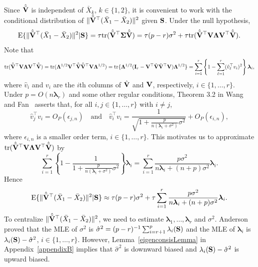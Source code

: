 \documentclass[times,sort&compress,3p]{elsarticle}
\newcommand{\mytr}{ {\rm tr} }
\newcommand{\myE}{ {\rm E} }
\newcommand{\bfsym}[1]{\ensuremath{\boldsymbol{#1}}}
\def\blambda {\bfsym {\lambda}}        \def\bLambda {\bfsym {\Lambda}}
\theoremstyle{plain}
\theoremstyle{definition}
\theoremstyle{remark}
\begin{document}
Since $\hat{\tilde{\mathbf{V}}}$ is independent of $\bar{X}_k$, $k\in\{1,2\}$, it is convenient to work with the conditional distribution of $\|\hat{\tilde{\mathbf{V}}}^\top  (\bar{X}_1-\bar{X}_2)\|^2$ given $\mathbf{S}$. 
Under the null hypothesis, 
\begin{equation*}
    \myE \{ \|\hat{\tilde{\BV}}^\top  (\bar{X}_1-\bar{X}_2)\|^2 |\BS \}
        =
\tau \mytr(\hat{\tilde{\BV}}^\top \bSigma\hat{\tilde{\BV}})
        =
\tau (p-r) \sigma^2+
\tau \mytr(\hat{\tilde{\BV}}^\top \BV \bLambda \BV^\top \hat{\tilde{\BV}}).
\end{equation*}
Note that
\begin{equation*}
    \mytr(\hat{\tilde{\BV}}^\top \BV \bLambda \BV^\top \hat{\tilde{\BV}})
=
\mytr( \bLambda^{1/2} \BV^\top \hat{\tilde{\BV}}\hat{\tilde{\BV}}^\top \BV \bLambda^{1/2} )
=
\mytr\{ \bLambda^{1/2} (\BI_r-\BV^\top \hat{\BV}\hat{\BV}^\top \BV) \bLambda^{1/2} \}
    =
    \sum_{i=1}^r  \left\{1-\sum_{\ell=1}^r (\hat{v}_\ell^\top  v_i)^2 \right\} \blambda_i,
\end{equation*}
where $\hat{v}_i$ and $v_i$ are the $i$th columns of $\hat{\mathbf{V}}$ and $\mathbf{V}$, respectively, $i\in \{1,\ldots, r\}$.
Under $p=O(n\blambda_r)$ and some other regular conditions, Theorem 3.2 in Wang and Fan~\cite{Fan2015Asymptotics} asserts that, for all $i,j\in\{1,\ldots, r\}$ with $i\neq j$,
\begin{equation}\label{yaofengla1}
    \hat{v}_j^\top  v_i=O_P(\epsilon_{j,n})
\quad \text{and}\quad
\hat{v}_i^\top  v_i=\frac{1}{\sqrt{1+ \frac{p}{n(\blambda_i+\sigma^2)}\sigma^2}}+O_P(\epsilon_{i,n}),
\end{equation}
where $\epsilon_{i,n}$ is a smaller order term, $i\in \{1,\ldots, r\}$.
This motivates us to approximate $\mytr(\hat{\tilde{\BV}}^\top \BV \bLambda \BV^\top \hat{\tilde{\BV}})$
by
$$
\sum_{i=1}^r \left\{ 1-\frac{1}{1+\frac{p}{n(\blambda_i+\sigma^2)}\sigma^2}\right\} \blambda_i
=
\sum_{i=1}^r \frac{p\sigma^2}{n\blambda_i+(n+p)\sigma^2}\blambda_i.
$$
Hence 
$$
\myE \{ \|\hat{\tilde{\BV}}^\top  (\bar{X}_1-\bar{X}_2)\|^2 |\BS \}
\approx
\tau(p-r)\sigma^2 + \tau\sum_{i=1}^r \frac{p\sigma^2}{n\blambda_i+(n+p)\sigma^2}\blambda_i.
$$
To centralize $\|\hat{\tilde{\mathbf{V}}}^\top  (\bar{X}_1-\bar{X}_2)\|^2$, we need to estimate $\blambda_1,\ldots, \blambda_r$ and $\sigma^2$.
Anderson~\cite{Anderson1986Asymptotic} proved that the MLE of $\sigma^2$ is $\hat{\sigma}^2=(p-r)^{-1}\sum_{i=r+1}^p \lambda_i(\mathbf{S})$ and the MLE of $\blambda_i$ is $\lambda_i(\mathbf{S})-\hat{\sigma}^2$, $i\in\{1,\ldots, r\}$.
However, Lemma~\ref{eigenconsisLemma} in Appendix~\ref{appendixB} implies that $\hat{\sigma}^2$ is downward biased and $\lambda_i(\mathbf{S})-\hat{\sigma}^2$ is upward biased.
\end{document}
